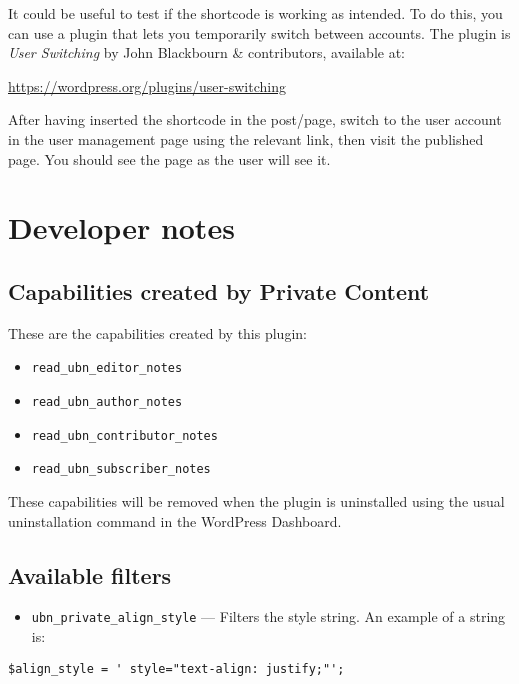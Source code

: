 It could be useful to test if the shortcode is working as intended. To do this,
you can use a plugin that lets you temporarily switch between accounts. The
plugin is \textit{User Switching} by John Blackbourn \& contributors, available
at:
\begin{center}
  \url{https://wordpress.org/plugins/user-switching}
\end{center}

After having inserted the shortcode in the post/page, switch to the user account
in the user management page using the relevant link, then visit the published
page. You should see the page as the user will see it.

\part{Developer notes}

\chapter{Capabilities created by Private Content}

These are the capabilities created by this plugin:

\begin{itemize}
 \item \verb+read_ubn_editor_notes+
 \item \verb+read_ubn_author_notes+
 \item \verb+read_ubn_contributor_notes+
 \item \verb+read_ubn_subscriber_notes+
\end{itemize}

These capabilities will be removed when the plugin is uninstalled using the
usual uninstallation command in the WordPress Dashboard.

\chapter{Available filters}

\begin{itemize}
 \item \verb+ubn_private_align_style+ --- Filters the style string. An example of
 a string is:
\end{itemize}

\begin{lstlisting}
$align_style = ' style="text-align: justify;"';
\end{lstlisting}

